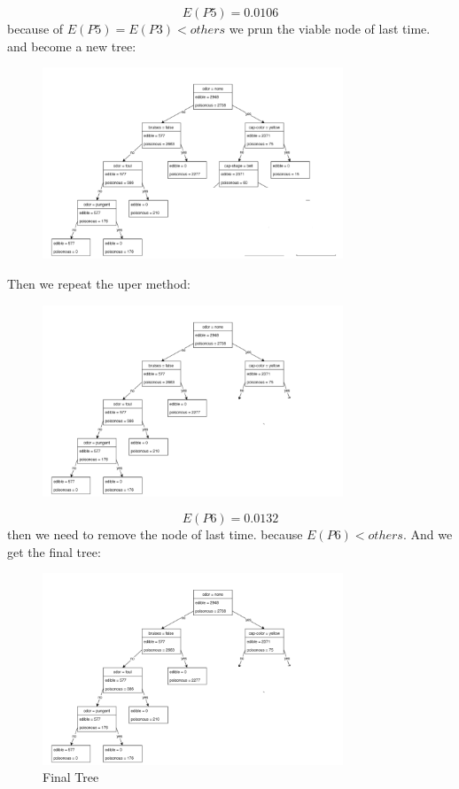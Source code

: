 \documentclass{article}
\begin{document}
\[E(P5)=0.0106\]
because of $E(P5)=E(P3)<others$  we prun the viable node of last time. and become a new tree:
\begin{figure}[H]
    \centering
    \includegraphics[width=0.8\textwidth]{pruningDrei_1.png}
\end{figure}
Then we repeat the uper method:
\begin{figure}[H]
    \centering
    \includegraphics[width=0.8\textwidth]{pruningZwei_1.png}
\end{figure}
\[E(P6)=0.0132\]
then we need to remove the node of last time. because $E(P6)<others$. 
And we get the final tree:
\begin{figure}[H]
    \centering
    \includegraphics[width=0.8\textwidth]{pruningZwei_1.png}
    \caption{Final Tree}
\end{figure}
\end{document}
